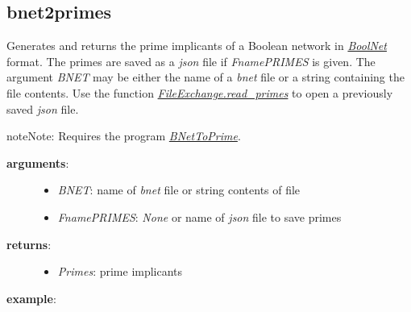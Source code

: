 \documentclass[letterpaper,10pt,english]{sphinxmanual}
\begin{document}
\subsection{bnet2primes}
\label{FileExchange:id2}\label{FileExchange:bnet2primes}

\begin{fulllineitems}
\label{FileExchange:PyBoolNet.FileExchange.bnet2primes}
Generates and returns the prime implicants of a Boolean network in {\hyperref[Installation:installation-boolnet]{\emph{BoolNet}}} format.
The primes are saved as a \emph{json} file if \emph{FnamePRIMES} is given.
The argument \emph{BNET} may be either the name of a \emph{bnet} file or a string containing the file contents.
Use the function {\hyperref[FileExchange:read-primes]{\emph{FileExchange.read\_primes}}} to open a previously saved \emph{json} file.

\begin{notice}{note}{Note:}
Requires the program {\hyperref[Installation:installation-bnettoprime]{\emph{BNetToPrime}}}.
\end{notice}
\begin{description}
\item[{\textbf{arguments}:}] \leavevmode\begin{itemize}
\item {} 
\emph{BNET}: name of \emph{bnet} file or string contents of file

\item {} 
\emph{FnamePRIMES}: \emph{None} or name of \emph{json} file to save primes

\end{itemize}

\item[{\textbf{returns}:    }] \leavevmode\begin{itemize}
\item {} 
\emph{Primes}: prime implicants

\end{itemize}

\end{description}

\textbf{example}:


\end{fulllineitems}
\end{document}
